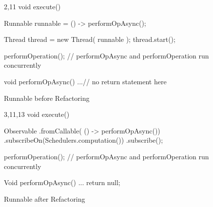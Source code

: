 \begin{figure}[H]
\begin{minipage}{0.48\textwidth}
\begin{sourcecode}
\begin{javacode}{2,11}
void execute() {
	Runnable runnable = () -> performOpAsync();

	Thread thread = new Thread( runnable );
	thread.start();

	performOperation();
	// performOpAsync and performOperation run concurrently
}

void performOpAsync() {
	...// no return statement here
}
\end{javacode}
\caption{Runnable before Refactoring}
\label{code:con-runnable-before}
\end{sourcecode}
\end{minipage}\hspace{0.7cm}
\begin{minipage}{0.48\textwidth}
\begin{sourcecode}
\begin{javacode}{3,11,13}
void execute() {
	Observable
    	    .fromCallable( () -> performOpAsync())
        	.subscribeOn(Schedulers.computation())
	        .subscribe();

	performOperation();
	// performOpAsync and performOperation run concurrently
}

Void performOpAsync() {
	...
	return null;
}
\end{javacode}
\caption{Runnable after Refactoring}
\label{code:con-runnable-after}
\end{sourcecode}
\end{minipage}
\end{figure}